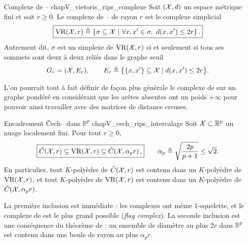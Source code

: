 \begin{Definition}{Complexe de -- \cite{Munkres, BoissonnatChazalYvinec}}{chapV_vietoris_rips_complexe}
Soit $(\mathcal{X},d)$ un espace métrique fini et soit $r\ge0$. Le complexe de -- de rayon $r$ est le complexe simplicial
\[
\boxed{
    \mathrm{VR}(\mathcal{X},r)
    \triangleq
    \left\{
        \sigma\subseteq \mathcal{X}
        \ \middle|\
        \forall x,x'\in\sigma,\ d(x,x')\le 2r
    \right\}.
    }
\]
Autrement dit, $\sigma$ est un simplexe de $\mathrm{VR}(\mathcal{X},r)$ si et seulement si tous ses sommets sont deux à deux reliés dans le graphe seuil
\[
    G_r=(\mathcal{X},E_r),
    \qquad
    E_r\triangleq
    \bigl\{\{x,x'\}\subseteq\mathcal{X}\mid d(x,x')\le 2r\bigr\}.
\]
\end{Definition}

L'on pourrait tout à fait définir de façon plus générale le complexe de  sur un graphe pondéré en considérant que les arêtes absentes ont un poids $+\infty$ pour pouvoir ainsi travailler avec des matrices de distance creuses.


\begin{Resultat}{Encadrement \v Cech-- dans $\mathbb R^p$ \cite{BoissonnatChazalYvinec}}{chapV_cech_rips_intercalage}
Soit $\mathcal{X}\subset\mathbb R^p$ un nuage localement fini. Pour tout $r\ge0$,
\[
\boxed{
    \check C(\mathcal{X},r)
    \subseteq
    \mathrm{VR}(\mathcal{X},r)
    \subseteq
    \check C\!\left(\mathcal{X},\alpha_p r\right),}
    \qquad
    \alpha_p\triangleq \sqrt{\frac{2p}{p+1}}\le\sqrt2.
\]
En particulier, tout $K$-polyèdre de $\check C(\mathcal{X},r)$ est contenu dans un $K$-polyèdre de $\mathrm{VR}(\mathcal{X},r)$, et tout $K$-polyèdre de $\mathrm{VR}(\mathcal{X},r)$ est contenu dans un $K$-polyèdre de $\check C(\mathcal{X},\alpha_p r)$.
\end{Resultat}
\begin{preuve}
La première inclusion est immédiate : les complexes ont même $1$-squelette, et le complexe de  est le plus grand possible (\emph{flag complex}). La seconde inclusion est une conséquence du théorème de  \cite{jung1901kleinste} : un ensemble de diamètre au plus $2r$ dans $\mathbb R^p$ est contenu dans une boule de rayon au plus $\alpha_p r$.
\end{preuve}

